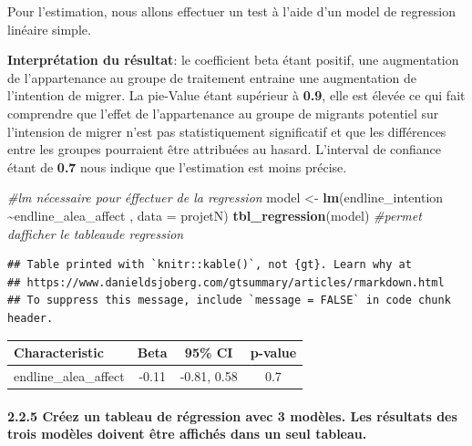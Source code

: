 \documentclass[
]{article}
\newenvironment{Shaded}{\begin{snugshade}}{\end{snugshade}}
\newcommand{\AttributeTok}[1]{\textcolor[rgb]{0.13,0.29,0.53}{#1}}
\newcommand{\CommentTok}[1]{\textcolor[rgb]{0.56,0.35,0.01}{\textit{#1}}}
\newcommand{\FunctionTok}[1]{\textcolor[rgb]{0.13,0.29,0.53}{\textbf{#1}}}
\newcommand{\NormalTok}[1]{#1}
\newcommand{\OtherTok}[1]{\textcolor[rgb]{0.56,0.35,0.01}{#1}}
\newcommand{\SpecialCharTok}[1]{\textcolor[rgb]{0.81,0.36,0.00}{\textbf{#1}}}
\begin{document}
Pour l'estimation, nous allons effectuer un test à l'aide d'un model de
regression linéaire simple.

\textbf{Interprétation du résultat}: le coefficient beta étant positif,
une augmentation de l'appartenance au groupe de traitement entraine une
augmentation de l'intention de migrer. La pie-Value étant supérieur à
\textbf{0.9}, elle est élevée ce qui fait comprendre que l'effet de
l'appartenance au groupe de migrants potentiel sur l'intension de migrer
n'est pas statistiquement significatif et que les différences entre les
groupes pourraient être attribuées au hasard. L'interval de confiance
étant de \textbf{0.7} nous indique que l'estimation est moins précise.

\begin{Shaded}
\begin{Highlighting}[]
\CommentTok{\#lm nécessaire pour éffectuer de la regression}
\NormalTok{model }\OtherTok{\textless{}{-}} \FunctionTok{lm}\NormalTok{(endline\_intention }\SpecialCharTok{\textasciitilde{}}\NormalTok{endline\_alea\_affect , }\AttributeTok{data =}\NormalTok{ projetN)}
\FunctionTok{tbl\_regression}\NormalTok{(model) }\CommentTok{\#permet d\textquotesingle{}afficher le tableaude regression}
\end{Highlighting}
\end{Shaded}

\begin{verbatim}
## Table printed with `knitr::kable()`, not {gt}. Learn why at
## https://www.danieldsjoberg.com/gtsummary/articles/rmarkdown.html
## To suppress this message, include `message = FALSE` in code chunk header.
\end{verbatim}

\begin{longtable}[]{@{}lccc@{}}
\toprule\noalign{}
\textbf{Characteristic} & \textbf{Beta} & \textbf{95\% CI} &
\textbf{p-value} \\
\midrule\noalign{}
\endhead
\bottomrule\noalign{}
\endlastfoot
endline\_alea\_affect & -0.11 & -0.81, 0.58 & 0.7 \\
\end{longtable}

\hypertarget{cruxe9ez-un-tableau-de-ruxe9gression-avec-3-moduxe8les.-les-ruxe9sultats-des-trois-moduxe8les-doivent-uxeatre-affichuxe9s-dans-un-seul-tableau.}{%
\paragraph{2.2.5 Créez un tableau de régression avec 3 modèles. Les
résultats des trois modèles doivent être affichés dans un seul
tableau.}\label{cruxe9ez-un-tableau-de-ruxe9gression-avec-3-moduxe8les.-les-ruxe9sultats-des-trois-moduxe8les-doivent-uxeatre-affichuxe9s-dans-un-seul-tableau.}}
\end{document}
